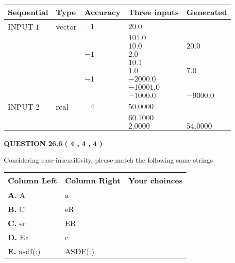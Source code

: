 \documentclass[12pt]{article}
\begin{document}
  
\noindent\begin{tabular}{|l|l|l|l|l|}
\hline
 Sequential & Type & Accuracy & Three inputs & Generated \\ 
\hline
 
 
  INPUT $            1 $ & vector & $           -1  $ & $
20.0
  $ & \\
  & & & $
101.0
  $ & \\
  & & & $
10.0
$ & $ 20.0 $ 
  \\
  & & $           -1  $ & $
2.0
  $ & \\
  & & & $
10.1
  $ & \\
  & & & $
1.0
$ & $ 7.0 $ 
  \\
  & & $           -1  $ & $
-2000.0
  $ & \\
  & & & $
-10001.0
  $ & \\
  & & & $
-1000.0
$ & $ -9000.0 $ 
 \\  \hline  
 
 
  INPUT $            2 $ & real & $           -4  $ & $
 50.0000
  $ & \\
  & & &  $
 60.1000
  $ & \\
  & & &  $
 2.0000
 $ & $ 54.0000 $ 
 \\  \hline  
 \end{tabular}
   
   
  
\vspace{0.2in}
  
{\textbf{\Large{QUESTION
26.6 
 (           4 ,           4 ,           4 )
}}}
  
  
Considering case-insensitivity, please match the following same strings.
  
  
\begin{tabular}{|l|l|l|}
 \hline
 Column Left & Column Right  & Your choinces \\ 
 \hline
{\textbf{\large{
A.}}}
A
  & 
a
 & 
 \\ 
 \hline
{\textbf{\large{
B.}}}
C
  & 
eR
 & 
 \\ 
 \hline
{\textbf{\large{
C.}}}
er
  & 
ER
 & 
 \\ 
 \hline
{\textbf{\large{
D.}}}
Er
  & 
c
 & 
 \\ 
 \hline
{\textbf{\large{
E.}}}
asdf(:)
  & 
ASDF(:)
 & 
 \\ 
 \hline
 \end{tabular}
  
  
 
 
\noindent{}
  
\end{document}
